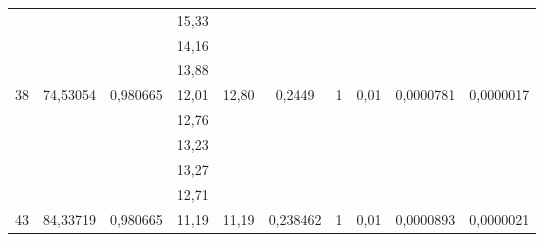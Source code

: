 \documentclass[a4paper, 12pt]{article}
\begin{document}
\begin{table}[h!]
\begin{tabular}{|c|c|c|c|c|c|c|c|c|c|}
                    &                           &                           & 15,33          &                           &                                    &                    &                         &                            &                               \\ \cline{4-4}
                    &                           &                           & 14,16          &                           &                                    &                    &                         &                            &                               \\ \cline{4-4}
                    &                           &                           & 13,88          &                           &                                    &                    &                         &                            &                               \\ \hline
\multirow{5}{*}{38} & \multirow{5}{*}{74,53054} & \multirow{5}{*}{0,980665} & 12,01          & \multirow{5}{*}{12,80}    & \multirow{5}{*}{0,2449}            & \multirow{5}{*}{1} & \multirow{5}{*}{0,01}   & \multirow{5}{*}{0,0000781} & \multirow{5}{*}{0,0000017}    \\ \cline{4-4}
                    &                           &                           & 12,76          &                           &                                    &                    &                         &                            &                               \\ \cline{4-4}
                    &                           &                           & 13,23          &                           &                                    &                    &                         &                            &                               \\ \cline{4-4}
                    &                           &                           & 13,27          &                           &                                    &                    &                         &                            &                               \\ \cline{4-4}
                    &                           &                           & 12,71          &                           &                                    &                    &                         &                            &                               \\ \hline
\multirow{5}{*}{43} & \multirow{5}{*}{84,33719} & \multirow{5}{*}{0,980665} & 11,19          & \multirow{5}{*}{11,19}    & \multirow{5}{*}{0,238462}          & \multirow{5}{*}{1} & \multirow{5}{*}{0,01}   & \multirow{5}{*}{0,0000893} & \multirow{5}{*}{0,0000021}    \\ \cline{4-4}

\end{tabular}
\end{table}
\end{document}
